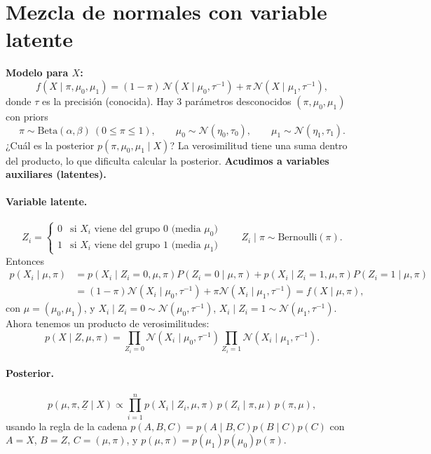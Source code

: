 \documentclass[11pt]{article}
\newcommand{\N}{\mathcal{N}}
\theoremstyle{definition}
\begin{document}
\section{Mezcla de normales con variable latente}
\textbf{Modelo para $X$:}
\[
f(X\mid\pi,\mu_0,\mu_1)=(1-\pi)\,\N(X\mid\mu_0,\tau^{-1})+\pi\,\N(X\mid\mu_1,\tau^{-1}),
\]
donde $\tau$ es la precisión (conocida). Hay 3 parámetros desconocidos $(\pi,\mu_0,\mu_1)$ con priors
\[
\pi\sim\text{Beta}(\alpha,\beta)\ (0\le\pi\le1),\qquad \mu_0\sim\N(\eta_0,\tau_0),\qquad \mu_1\sim\N(\eta_1,\tau_1).
\]
¿Cuál es la posterior $p(\pi,\mu_0,\mu_1\mid X)$? La verosimilitud tiene una suma dentro del producto, lo que dificulta calcular la posterior. \textbf{Acudimos a variables auxiliares (latentes).}

\paragraph{Variable latente.}
\[
Z_i=\begin{cases}0 & \text{si }X_i\text{ viene del grupo 0 (media }\mu_0)\\ 1 & \text{si }X_i\text{ viene del grupo 1 (media }\mu_1)\end{cases}
\qquad Z_i\mid\pi\sim\text{Bernoulli}(\pi).
\]
Entonces
\begin{align*}
p(X_i\mid\mu,\pi)&=p(X_i\mid Z_i=0,\mu,\pi)P(Z_i=0\mid\mu,\pi)+p(X_i\mid Z_i=1,\mu,\pi)P(Z_i=1\mid\mu,\pi)\\
&=(1-\pi)\N(X_i\mid\mu_0,\tau^{-1})+\pi\N(X_i\mid\mu_1,\tau^{-1})=f(X\mid\mu,\pi),
\end{align*}
con $\mu=(\mu_0,\mu_1)$, y $X_i\mid Z_i=0\sim\N(\mu_0,\tau^{-1})$, $X_i\mid Z_i=1\sim\N(\mu_1,\tau^{-1})$. Ahora tenemos un producto de verosimilitudes:
\[
p(X\mid Z,\mu,\pi)=\prod_{Z_i=0}\N(X_i\mid\mu_0,\tau^{-1})\prod_{Z_i=1}\N(X_i\mid\mu_1,\tau^{-1}).
\]

\paragraph{Posterior.}
\[
p(\mu,\pi,\underline Z\mid X)\propto\prod_{i=1}^n p(X_i\mid Z_i,\mu,\pi)\,p(Z_i\mid\pi,\mu)\,p(\pi,\mu),
\]
usando la regla de la cadena $p(A,B,C)=p(A\mid B,C)p(B\mid C)p(C)$ con $A=X$, $B=Z$, $C=(\mu,\pi)$, y $p(\mu,\pi)=p(\mu_1)p(\mu_0)p(\pi)$.
\end{document}

